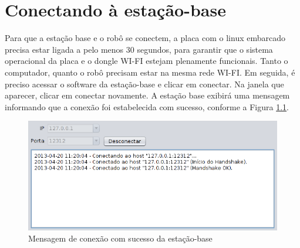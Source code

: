 \chapter{Conectando à estação-base}

Para que a estação base e o robô se conectem, a placa com o linux embarcado precisa estar ligada a pelo menos 30 segundos, para garantir que o sistema operacional da placa e o dongle WI-FI estejam plenamente funcionais. Tanto o computador, quanto o robô precisam estar na mesma rede WI-FI. Em seguida, é preciso acessar o software da estação-base e clicar em conectar. Na janela que aparecer, clicar em conectar novamente. A estação base exibirá uma mensagem informando que a conexão foi estabelecida com sucesso, conforme a Figura \ref{fig:conectado}.


\begin{figure}[H]
\centering
\includegraphics[width=\textwidth]{./images/conectado.png}
\caption{Mensagem de conexão com sucesso da estação-base}
\label{fig:conectado}
\end{figure}

